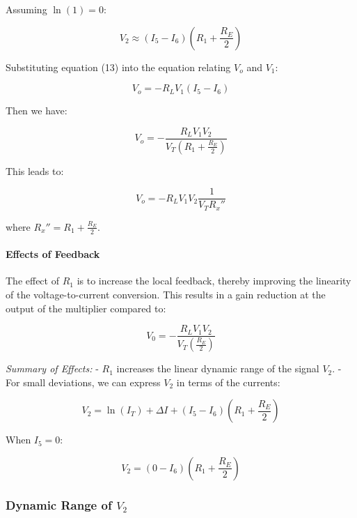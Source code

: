 \documentclass[a4paper,9pt,twoside,openany,twocolumn]{memoir}
\begin{document}
Assuming \(\ln(1) = 0\):

\begin{equation}
V_2 \approx (I_5 - I_6) \left( R_1 + \frac{R_E}{2} \right) \tag{13}
\end{equation}

Substituting equation (13) into the equation relating \(V_o\) and \(V_1\):

\begin{equation}
V_o = -R_L V_1 (I_5 - I_6) \tag{14}
\end{equation}

Then we have:

\begin{equation}
V_o = -\frac{R_L V_1 V_2}{V_T \left( R_1 + \frac{R_E}{2} \right)} \tag{15}
\end{equation}

This leads to:

\begin{equation}
V_o = -R_L V_1 V_2 \frac{1}{V_T R_x''} \tag{16}
\end{equation}

where \(R_x'' = R_1 + \frac{R_E}{2}\).

\paragraph{Effects of Feedback}
The effect of \(R_1\) is to increase the local feedback, thereby improving the linearity of the voltage-to-current conversion. This results in a gain reduction at the output of the multiplier compared to:

\begin{equation}
V_0 = -\frac{R_L V_1 V_2}{V_T \left( \frac{R_E}{2} \right)} \tag{17}
\end{equation}

\textit{Summary of Effects:}
- \(R_1\) increases the linear dynamic range of the signal \(V_2\).
- For small deviations, we can express \(V_2\) in terms of the currents:

\[
V_2 = \ln(I_T) + \Delta I + (I_5 - I_6) \left( R_1 + \frac{R_E}{2} \right) \tag{a}
\]

When \(I_5 = 0\):

\[
V_2 = (0 - I_6) \left( R_1 + \frac{R_E}{2} \right) \tag{b}
\]

\subsubsection{Dynamic Range of \( V_2 \)}
\end{document}
